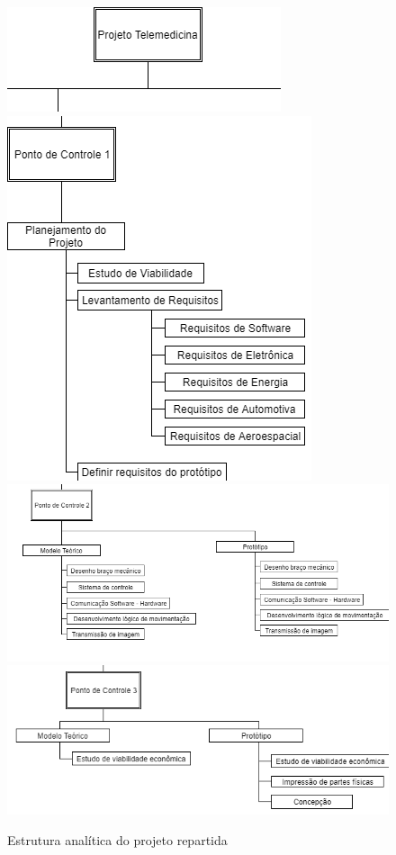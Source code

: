 \begin{figure}[h]
\centering
\begin{minipage}[c]{\textwidth}
\centering
  		\includegraphics[scale=0.5]{figuras/eap_cort1.png} \\
  		\includegraphics[scale=0.5]{figuras/eap_cort2.png} \\
  		\includegraphics[scale=0.5]{figuras/eap_cort3.png} \\
 	    \includegraphics[scale=0.5]{figuras/eap_cort4.png}
    	\caption{Estrutura analítica do projeto repartida}
    	\label{fig:sample_figure}
\end{minipage}
\end{figure}


